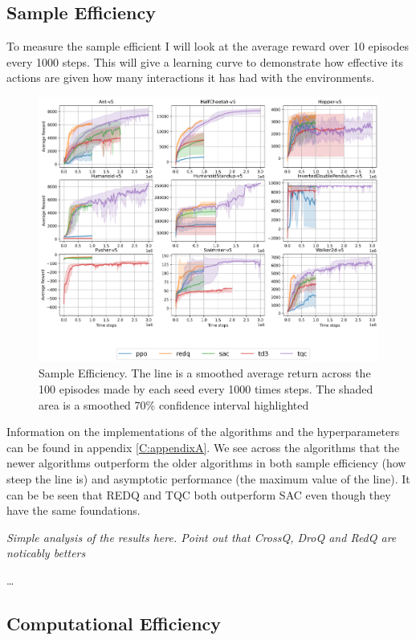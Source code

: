 \subsection{Sample Efficiency}
To measure the sample efficient I will look at the average reward over 10 episodes every 1000 steps. This will give a learning curve to demonstrate how effective its actions are given how many interactions it has had with the environments.

\begin{figure}[H]
    \centering
    \includegraphics[width=1\textwidth]{figures/baseline_results.png}
    \caption{Sample Efficiency. The line is a smoothed average return across the 100 episodes made by each seed every 1000 times steps. The shaded area is a smoothed 70\% confidence interval highlighted }
    \label{fig:sample_efficiency}
\end{figure}

Information on the implementations of the algorithms and the hyperparameters can be found in appendix \ref{C:appendixA}. We see across the algorithms that the newer algorithms outperform the older algorithms in both sample efficiency (how steep the line is) and asymptotic performance (the maximum value of the line). It can be be seen that REDQ and TQC both outperform SAC even though they have the same foundations.

\textit{Simple analysis of the results here. Point out that CrossQ, DroQ and RedQ are noticably betters }

\dots

\subsection{Computational Efficiency}

